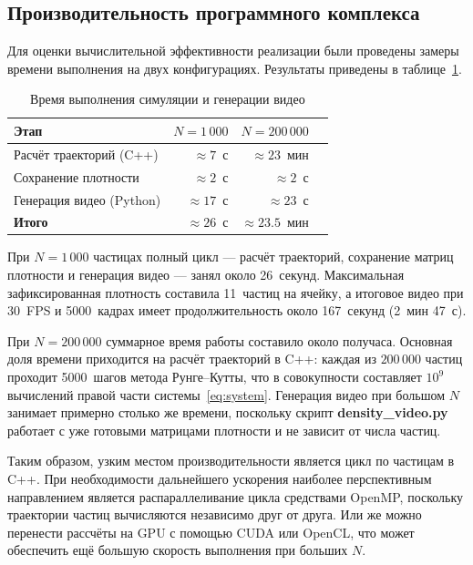\documentclass[14pt,a4paper]{extarticle}
\numberwithin{figure}{section}
\numberwithin{table}{section}
\begin{document}
\subsection{Производительность программного комплекса}

Для оценки вычислительной эффективности реализации были проведены замеры
времени выполнения на двух конфигурациях. Результаты приведены в
таблице~\ref{tab:performance}.

\begin{table}[h]
\centering
\caption{Время выполнения симуляции и генерации видео}
\label{tab:performance}
\begin{tabular}{|l|r|r|r|}
\hline
\textbf{Этап} & \textbf{$N = 1\,000$} & \textbf{$N = 200\,000$} \\
\hline
Расчёт траекторий (C++)   & $\approx 7$~с   & $\approx 23$~мин \\
Сохранение плотности      & $\approx 2$~с   & $\approx 2$~с  \\
Генерация видео (Python)  & $\approx 17$~с  & $\approx 23$~с  \\
\hline
\textbf{Итого}            & $\approx 26$~с  & $\approx 23.5$~мин \\
\hline
\end{tabular}
\end{table}

При $N = 1\,000$ частицах полный цикл --- расчёт траекторий, сохранение
матриц плотности и генерация видео --- занял около 26~секунд.
Максимальная зафиксированная плотность составила 11~частиц на ячейку,
а итоговое видео при 30~FPS и 5000~кадрах имеет продолжительность около
167~секунд (2~мин 47~с).

При $N = 200\,000$ суммарное время работы составило около получаса.
Основная доля времени приходится на расчёт траекторий в C++: каждая из
$200\,000$ частиц проходит 5000~шагов метода Рунге--Кутты, что в совокупности
составляет $10^9$ вычислений правой части системы~\eqref{eq:system}.
Генерация видео при большом $N$ занимает примерно столько же времени,
поскольку скрипт \textbf{density\_video.py} работает с уже готовыми
матрицами плотности и не зависит от числа частиц.

Таким образом, узким местом производительности является цикл по частицам
в C++. При необходимости дальнейшего ускорения наиболее перспективным
направлением является распараллеливание цикла средствами \linebreak OpenMP, поскольку
траектории частиц вычисляются независимо друг от друга. Или же можно перенести рассчёты
на GPU с помощью CUDA или OpenCL, что может обеспечить ещё большую скорость выполнения
при больших $N$.
\end{document}
